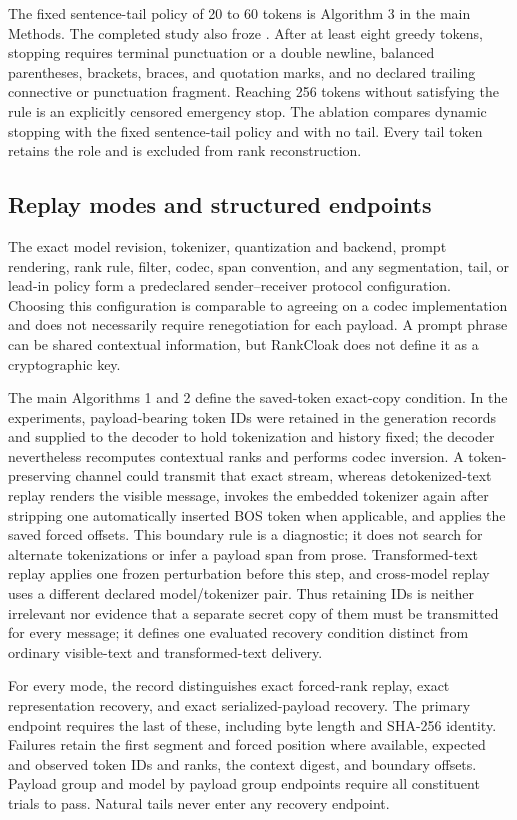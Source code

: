 \documentclass[fleqn,10pt]{wlscirep}
\DeclareRobustCommand{\code}[1]{\path{#1}}
\begin{document}
The fixed sentence-tail policy of 20 to 60 tokens is Algorithm 3 in the main Methods. The completed study also froze \code{dynamic_completion_v1}. After at least eight greedy tokens, stopping requires terminal punctuation or a double newline, balanced parentheses, brackets, braces, and quotation marks, and no declared trailing connective or punctuation fragment. Reaching 256 tokens without satisfying the rule is an explicitly censored emergency stop. The ablation compares dynamic stopping with the fixed sentence-tail policy and with no tail. Every tail token retains the role \code{tail} and is excluded from rank reconstruction.

\subsection*{Replay modes and structured endpoints}

The exact model revision, tokenizer, quantization and backend, prompt rendering, rank rule, filter, codec, span convention, and any segmentation, tail, or lead-in policy form a predeclared sender--receiver protocol configuration. Choosing this configuration is comparable to agreeing on a codec implementation and does not necessarily require renegotiation for each payload. A prompt phrase can be shared contextual information, but RankCloak does not define it as a cryptographic key.

The main Algorithms 1 and 2 define the saved-token exact-copy condition. In the experiments, payload-bearing token IDs were retained in the generation records and supplied to the decoder to hold tokenization and history fixed; the decoder nevertheless recomputes contextual ranks and performs codec inversion. A token-preserving channel could transmit that exact stream, whereas detokenized-text replay renders the visible message, invokes the embedded tokenizer again after stripping one automatically inserted BOS token when applicable, and applies the saved forced offsets. This boundary rule is a diagnostic; it does not search for alternate tokenizations or infer a payload span from prose. Transformed-text replay applies one frozen perturbation before this step, and cross-model replay uses a different declared model/tokenizer pair. Thus retaining IDs is neither irrelevant nor evidence that a separate secret copy of them must be transmitted for every message; it defines one evaluated recovery condition distinct from ordinary visible-text and transformed-text delivery.

For every mode, the record distinguishes exact forced-rank replay, exact representation recovery, and exact serialized-payload recovery. The primary endpoint requires the last of these, including byte length and SHA-256 identity. Failures retain the first segment and forced position where available, expected and observed token IDs and ranks, the context digest, and boundary offsets. Payload group and model by payload group endpoints require all constituent trials to pass. Natural tails never enter any recovery endpoint.
\end{document}
